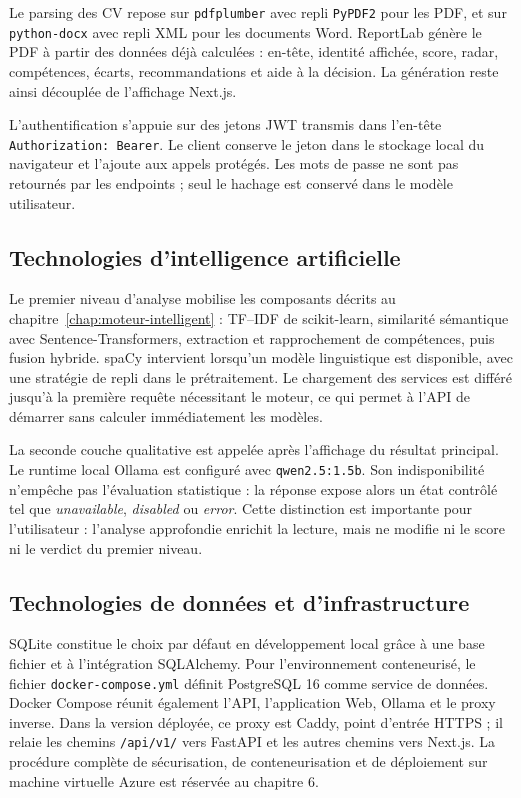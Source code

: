 Le parsing des CV repose sur \texttt{pdfplumber} avec repli \texttt{PyPDF2} pour les PDF, et sur \texttt{python-docx} avec repli XML pour les documents Word. ReportLab génère le PDF à partir des données déjà calculées : en-tête, identité affichée, score, radar, compétences, écarts, recommandations et aide à la décision. La génération reste ainsi découplée de l'affichage Next.js.

L'authentification s'appuie sur des jetons JWT transmis dans l'en-tête \texttt{Authorization: Bearer}. Le client conserve le jeton dans le stockage local du navigateur et l'ajoute aux appels protégés. Les mots de passe ne sont pas retournés par les endpoints ; seul le hachage est conservé dans le modèle utilisateur.

\subsection{Technologies d'intelligence artificielle}

Le premier niveau d'analyse mobilise les composants décrits au chapitre~\ref{chap:moteur-intelligent} : TF--IDF de scikit-learn, similarité sémantique avec Sentence-Transformers, extraction et rapprochement de compétences, puis fusion hybride. spaCy intervient lorsqu'un modèle linguistique est disponible, avec une stratégie de repli dans le prétraitement. Le chargement des services est différé jusqu'à la première requête nécessitant le moteur, ce qui permet à l'API de démarrer sans calculer immédiatement les modèles.

La seconde couche qualitative est appelée après l'affichage du résultat principal. Le runtime local Ollama est configuré avec \texttt{qwen2.5:1.5b}. Son indisponibilité n'empêche pas l'évaluation statistique : la réponse expose alors un état contrôlé tel que \emph{unavailable}, \emph{disabled} ou \emph{error}. Cette distinction est importante pour l'utilisateur : l'analyse approfondie enrichit la lecture, mais ne modifie ni le score ni le verdict du premier niveau.

\subsection{Technologies de données et d'infrastructure}

SQLite constitue le choix par défaut en développement local grâce à une base fichier et à l'intégration SQLAlchemy. Pour l'environnement conteneurisé, le fichier \texttt{docker-compose.yml} définit PostgreSQL 16 comme service de données. Docker Compose réunit également l'API, l'application Web, Ollama et le proxy inverse. Dans la version déployée, ce proxy est Caddy, point d'entrée HTTPS ; il relaie les chemins \texttt{/api/v1/} vers FastAPI et les autres chemins vers Next.js. La procédure complète de sécurisation, de conteneurisation et de déploiement sur machine virtuelle Azure est réservée au chapitre 6.

